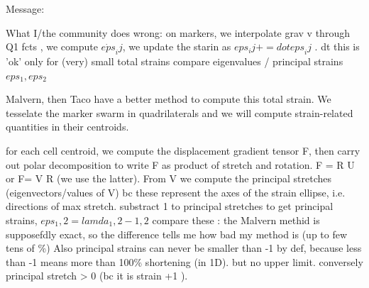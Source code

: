 \newpage
Message:

What I/the community does wrong:
on markers, we interpolate grav v through Q1 fcts , we compute $\dot{eps}_ij$, we
update the starin as $eps_ij += dot{eps}_ij$ . dt 
this is 'ok' only for (very) small total strains 
compare eigenvalues / principal strains $eps_1, eps_2$  


Malvern, then Taco have a better method to compute this total strain. 
We tesselate the marker swarm in quadrilaterals and we will compute
strain-related quantities in their centroids.

for each cell centroid, we compute the displacement gradient tensor F, 
then carry out polar decomposition to write F as product of stretch and rotation. 
F = R U  or F=  V R (we use the latter).
From V we compute the principal stretches (eigenvectors/values of V) bc
these represent the axes of the strain ellipse, i.e. directions of max stretch.
substract 1 to principal stretches to get principal strains, $eps_1,2 = lamda_1,2 - 1,2 $
compare these : the Malvern methid is supposefdly exact, so the difference tells me 
how bad my method is (up to few tens of \%) 
Also principal strains can never be smaller than -1 by def, because less than -1 means
more than 100\%  shortening (in 1D). but no upper limit.
conversely principal stretch > 0 (bc it is strain +1 ).







